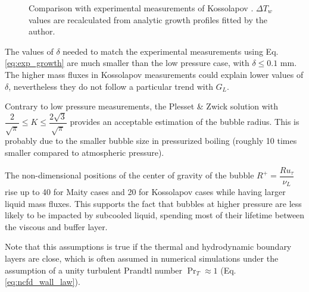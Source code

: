 \begin{figure}[h!]
\begin{center}


	\caption{Comparison with experimental measurements of Kossolapov \cite{kossolapov_experimental_2021}. $\Delta T_{w}$ values are recalculated from analytic growth profiles fitted by the author.}
	\label{fig:comp_growth_koss}
\end{center}
\end{figure}


The values of $\delta$ needed to match the experimental measurements using Eq. \ref{eq:exp_growth} are much smaller than the low pressure case, with $\delta \leq 0.1$ mm. The higher mass fluxes in Kossolapov measurements could explain lower values of $\delta$, nevertheless they do not follow a particular trend with $G_{L}$.

\npar

Contrary to low pressure measurements, the Plesset \& Zwick solution with $\dfrac{2}{\sqrt{\pi}} \leq K \leq \dfrac{2\sqrt{3}}{\sqrt{\pi}}$ provides an acceptable estimation of the bubble radius. This is probably due to the smaller bubble size in pressurized boiling (roughly 10 times smaller compared to atmospheric pressure). 

\begin{remark*}{}
The non-dimensional positions of the center of gravity of the bubble $R^{+}=\dfrac{R u_{\tau}}{\nu_{L}}$ rise up to 40 for Maity cases and 20 for Kossolapov cases while having larger liquid mass fluxes. This supports the fact that bubbles at higher pressure are less likely to be impacted by subcooled liquid, spending most of their lifetime between the viscous and buffer layer. 

\npar

Note that this assumptions is true if the thermal and hydrodynamic boundary layers are close, which is often assumed in numerical simulations under the assumption of a unity turbulent Prandtl number $\Pr_{T} \approx 1$ (Eq. \ref{eq:ncfd_wall_law}).
\end{remark*}


